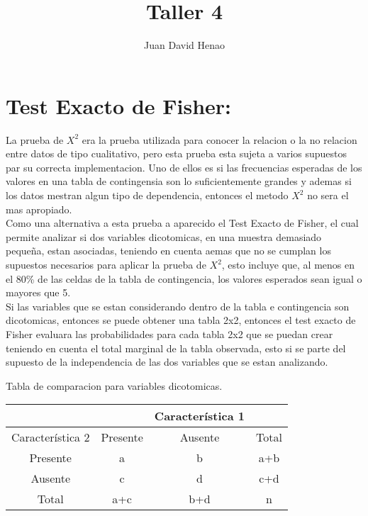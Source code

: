 \documentclass[12pt]{article}
\title{Taller 4}
\author{Juan David Henao}
\begin{document}


\maketitle

\section{Test Exacto de Fisher: }

La prueba de $X^2$ era la prueba utilizada para conocer la relacion o la no relacion entre datos de tipo cualitativo, pero esta prueba esta sujeta a varios supuestos par su correcta implementacion. Uno de ellos es si las frecuencias esperadas de los valores en una tabla de contingensia son lo suficientemente grandes y ademas si los datos mestran algun tipo de dependencia, entonces el metodo $X^2$ no sera el mas apropiado.\\

Como una alternativa a esta prueba a aparecido el Test Exacto de Fisher, el cual permite analizar si dos variables dicotomicas, en una muestra demasiado pequeña, estan asociadas, teniendo en cuenta aemas que no se cumplan los supuestos necesarios para aplicar la prueba de $X^2$, esto incluye que, al menos en el 80\% de las celdas de la tabla de contingencia, los valores esperados sean igual o mayores que 5.\\

Si las variables que se estan considerando dentro de la tabla e contingencia son dicotomicas, entonces se puede obtener una tabla 2x2, entonces el test exacto de Fisher evaluara las probabilidades para cada tabla 2x2 que se puedan crear teniendo en cuenta el total marginal de la tabla observada, esto si se parte del supuesto de la independencia de las dos variables que se estan analizando.\\

\begin{center}
Tabla de comparacion para variables dicotomicas.
\begin{tabular}{c|ccc|}
\cline{2-4}
 &  & Característica 1 &  \\ 
\hline 
\multicolumn{1}{|c|}{Característica 2} & Presente & Ausente & Total \\ 
\hline 
\multicolumn{1}{|c|}{Presente} & a & b & a+b \\ 
\hline 
\multicolumn{1}{|c|}{Ausente} & c & d & c+d \\ 
\hline 
\multicolumn{1}{|c|}{Total} & a+c & b+d & n \\ 
\hline 
\end{tabular}
\end{center}
\end{document}
